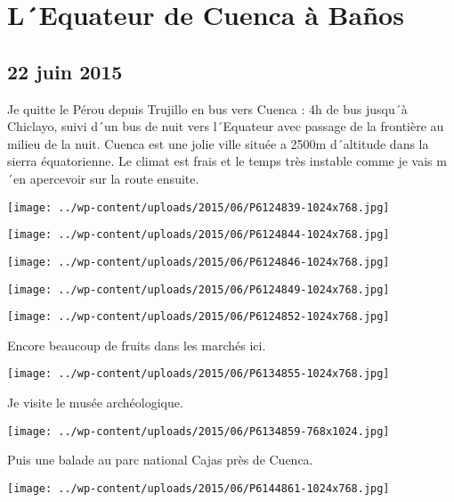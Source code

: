\chapter{L´Equateur de Cuenca à Baños}
\section*{22 juin 2015}
Je quitte le Pérou depuis Trujillo en bus vers Cuenca : 4h de bus jusqu´à Chiclayo, suivi d´un bus de nuit vers l´Equateur avec passage de la frontière au milieu de la nuit. \newline
 Cuenca est une jolie ville située a 2500m d´altitude dans la sierra équatorienne. Le climat est frais et le temps très instable comme je vais m´en apercevoir sur la route ensuite. \newline
 \newline
\centerline{\texttt{[image: ../wp-content/uploads/2015/06/P6124839-1024x768.jpg]} } 
 \newline
 \newline
\centerline{\texttt{[image: ../wp-content/uploads/2015/06/P6124844-1024x768.jpg]} } 
 \newline
 \newline
\centerline{\texttt{[image: ../wp-content/uploads/2015/06/P6124846-1024x768.jpg]} } 
 \newline
 \newline
\centerline{\texttt{[image: ../wp-content/uploads/2015/06/P6124849-1024x768.jpg]} } 
 \newline
 \newline
\centerline{\texttt{[image: ../wp-content/uploads/2015/06/P6124852-1024x768.jpg]} } 
 \newline
 Encore beaucoup de fruits dans les marchés ici. \newline
 \newline
\centerline{\texttt{[image: ../wp-content/uploads/2015/06/P6134855-1024x768.jpg]} } 
 \newline
 Je visite le musée archéologique. \newline
 \newline
\centerline{\texttt{[image: ../wp-content/uploads/2015/06/P6134859-768x1024.jpg]} } 
 \newline
 Puis une balade au parc national Cajas près de Cuenca. \newline
 \newline
\centerline{\texttt{[image: ../wp-content/uploads/2015/06/P6144861-1024x768.jpg]} } 
